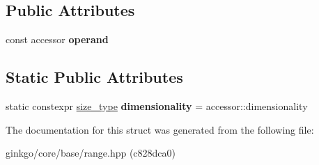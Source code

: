 \subsection*{Public Attributes}
\begin{DoxyCompactItemize}
\item 
\mbox{\label{structgko_1_1accessor_1_1transpose__operation_a2b4c2d5172d31e787f8d4965251743b3}} 
const accessor {\bfseries operand}
\end{DoxyCompactItemize}
\subsection*{Static Public Attributes}
\begin{DoxyCompactItemize}
\item 
\mbox{\label{structgko_1_1accessor_1_1transpose__operation_aee04484bec2b33a04e2482077a5925a5}} 
static constexpr \hyperlink{namespacegko_a6e5c95df0ae4e47aab2f604a22d98ee7}{size\+\_\+type} {\bfseries dimensionality} = accessor\+::dimensionality
\end{DoxyCompactItemize}


The documentation for this struct was generated from the following file\+:\begin{DoxyCompactItemize}
\item 
ginkgo/core/base/range.\+hpp (c828dca0)\end{DoxyCompactItemize}
